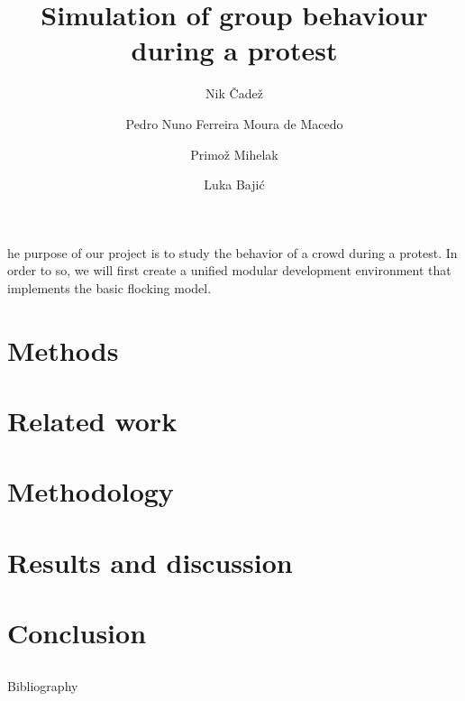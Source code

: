 \documentclass[9pt]{pnas-new}
\title{Simulation of group behaviour during a protest}
\author{Nik Čadež}
\author{Pedro Nuno Ferreira Moura de Macedo}
\author{Primož Mihelak}
\author{Luka Bajić}
\affil{Collective behaviour course research seminar report}
\begin{document}
\verticaladjustment{-2pt}

\maketitle
\thispagestyle{firststyle}

he purpose of our project is to study the behavior of a crowd during a protest. In order to so, we will first create a unified modular development environment that implements the basic flocking model.



\section*{Methods}

\section*{Related work}

\section*{Methodology}



\section*{Results and discussion}


\section*{Conclusion}

\showacknow %


\begin{multicols}{2}
\section*{\bibname}
 Bibliography

\end{multicols}
\end{document}
